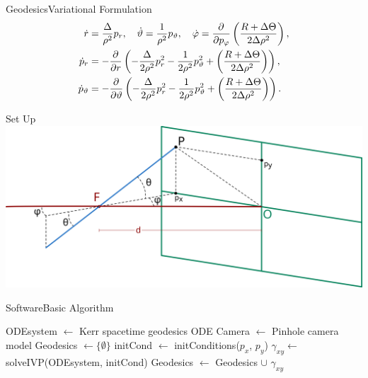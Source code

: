 \begin{frame}{Geodesics}{Variational Formulation}
	\large
	\begin{align*}
		\dot{r} &= \frac{\Delta}{\rho^2} p_r, \quad \dot{\vartheta} = \frac{1}{\rho^2}p_\vartheta, \quad
		\dot{\varphi} = \frac{\partial^{} }{\partial p_\varphi}\left( \frac{R + \Delta\Theta}{2\Delta\rho^2} \right), \\
		\dot{p}_r &= - \frac{\partial^{} }{\partial r} \left( - \frac{\Delta}{2\rho^2}p_r^2 - \frac{1}{2\rho^2}p_\vartheta^2 + \left( \frac{R + \Delta\Theta}{2\Delta\rho^2} \right) \right), \\
		\dot{p}_\vartheta &= - \frac{\partial^{} }{\partial \vartheta} \left( - \frac{\Delta}{2\rho^2}p_r^2 - \frac{1}{2\rho^2}p_\vartheta^2 + \left( \frac{R + \Delta\Theta}{2\Delta\rho^2} \right) \right).
	\end{align*}
	
\end{frame}




{
	\begin{frame}[plain]{Set Up}
		\centering
		\includegraphics[width=0.8\paperwidth]{gfx/pinhole}
	\end{frame}
}




\begin{frame}{Software}{Basic Algorithm}
	{
	\tiny
	\begin{algorithm}[H]
		\begin{algorithmic}[1]
			\State ODEsystem $\gets$ Kerr spacetime geodesics ODE
			\State Camera $\gets$ Pinhole camera model
			\State Geodesics $\gets \{\emptyset\}$
			\State initCond $\gets$ initConditions($p_x$, $p_y$)
			\State $\gamma_{xy} \gets$ solveIVP(ODEsystem, initCond)
			\State Geodesics $\gets$ Geodesics $\cup$ $\gamma_{xy}$
			\EndFor
			\EndFunction
		\end{algorithmic}
	\end{algorithm}
	}
\end{frame}

